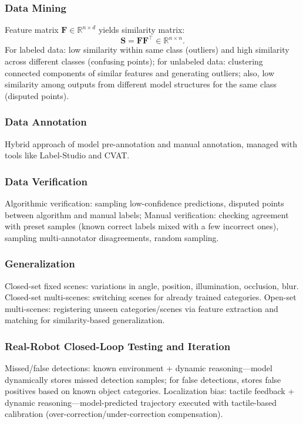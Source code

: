 \documentclass[12pt,a4paper]{article}
\begin{document}
\subsubsection{Data Mining}
Feature matrix $\mathbf{F} \in \mathbb{R}^{n \times d}$ yields similarity matrix:
\[
\mathbf{S} = \mathbf{F} \mathbf{F}^\top \in \mathbb{R}^{n \times n}.
\]
For labeled data: low similarity within same class (outliers) and high similarity across different classes (confusing points); for unlabeled data: clustering connected components of similar features and generating outliers; also, low similarity among outputs from different model structures for the same class (disputed points).

\subsubsection{Data Annotation}
Hybrid approach of model pre-annotation and manual annotation, managed with tools like Label-Studio and CVAT.

\subsubsection{Data Verification}
Algorithmic verification: sampling low-confidence predictions, disputed points between algorithm and manual labels; Manual verification: checking agreement with preset samples (known correct labels mixed with a few incorrect ones), sampling multi-annotator disagreements, random sampling.

\subsubsection{Generalization}
Closed-set fixed scenes: variations in angle, position, illumination, occlusion, blur.
Closed-set multi-scenes: switching scenes for already trained categories.
Open-set multi-scenes: registering unseen categories/scenes via feature extraction and matching for similarity-based generalization.

\subsubsection{Real-Robot Closed-Loop Testing and Iteration}
Missed/false detections: known environment + dynamic reasoning—model dynamically stores missed detection samples; for false detections, stores false positives based on known object categories.
Localization bias: tactile feedback + dynamic reasoning—model-predicted trajectory executed with tactile-based calibration (over-correction/under-correction compensation).
\end{document}
